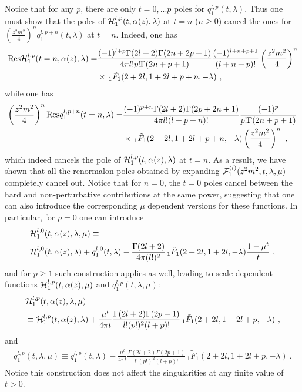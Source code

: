 \documentclass[a4paper,11pt]{article}
\begin{document}
Notice that for any $p$,  there are only $t=0,...p$  poles for $q_1^{l,p}(t,\lambda)$. Thus one must show that the poles of ${\cal H}_1^{l,p}(t,\alpha(z),\lambda)$ at $t=n$ ($n \ge 0$)  cancel the ones for $\left(\frac{z^2m^2}{4}\right)^nq^{l,p+n}_1(t,\lambda)$ at $t=n$. Indeed, one has
\begin{align}
{\rm Res} {\cal H}_{1}^{l,p}(t=n,\alpha(z),\lambda)=&\frac{(-1)^{l+p}\Gamma(2l+2)\Gamma(2n+2p+1)}{4\pi l!p!\Gamma(2n+p+1)}\frac{(-1)^{l+n+p+1}}{(l+n+p)!}\left(\frac{z^2m^2}{4}\right)^n \nonumber \\ 
&\times \,_1\tilde F_1(2+2l,1+2l+p+n,-\lambda) \ ,
\end{align}
while one has
 \begin{align}
\left(\frac{z^2m^2}{4}\right)^n {\rm Res} q_{1}^{l,p+n}(t=n,\lambda)=&\frac{(-1)^{p+n} \Gamma (2 l+2) \Gamma (2 p+2n+1) }{4 \pi  l! (l+p+n)! }\frac{(-1)^p}{p!\Gamma(2n+p+1)}\nonumber \\ 
&\times \,_1\tilde F_1(2+2l,1+2l+p+n,-\lambda)\left(\frac{z^2m^2}{4}\right)^n \ ,
 \end{align}
which indeed cancels the pole of ${\cal H}_1^{l,p}(t,\alpha(z),\lambda)$ at $t=n$. As a result, we have shown that all the renormalon poles obtained by expanding ${\cal F}_{1}^{(l)}(z^2m^2,t,\lambda,\mu)$ completely cancel out. Notice that for $n=0$,  the $t=0$ poles cancel between the hard and non-perturbative contributions at the same power, suggesting that one can also introduce the corresponding $\mu$ dependent versions for these functions. In particular, for $p=0$ one can introduce 
\begin{align}
&{\cal H}_1^{l,0}(t,\alpha(z),\lambda,\mu) \equiv \nonumber \\ 
& {\cal H}_1^{l,0}(t,\alpha(z),\lambda)+q_1^{l,0}(t,\lambda)-\frac{\Gamma(2l+2)}{4\pi (l!)^2}\,_1\tilde F_1(2+2l,1+2l,-\lambda)\frac{1-\mu^t}{t} \ , 
\end{align}
and for $p\ge 1$ such construction applies as well, leading to scale-dependent functions ${\cal H}_1^{l,p}(t,\alpha(z),\mu)$ and $q_1^{l,p}(t,\lambda,\mu)$:
\begin{align}\label{eq:H1lpmu}
&{\cal H}_1^{l,p}(t,\alpha(z),\lambda,\mu)\nonumber \\ 
&\equiv {\cal H}_1^{l,p}(t,\alpha(z),\lambda)+\frac{\mu^t}{4\pi t}\frac{\Gamma(2l+2)\Gamma(2p+1)}{l! (p!)^2(l+p)!}\,_1\tilde F_1(2+2l,1+2l+p,-\lambda) \ , 
\end{align}
and 
\begin{align}\label{eq:q1lpmu}
q_1^{l,p}(t,\lambda,\mu)\equiv q_1^{l,p}(t,\lambda) -\frac{\mu^t}{4\pi t}\frac{\Gamma(2l+2)\Gamma(2p+1)}{l! (p!)^2(l+p)!}\,_1\tilde F_1(2+2l,1+2l+p,-\lambda)  \ .
\end{align}
Notice this construction does not affect the singularities at any finite value of $t>0$.  
\end{document}
